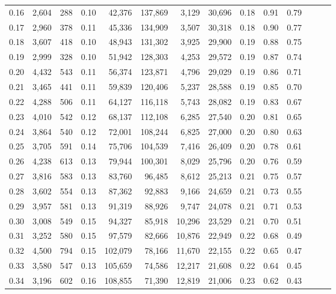 \begin{tabular}{rrrrrrrrrrrrrr}
0.16 &  2,604 &  288 &  0.10 &   42,376 &  137,869 &   3,129 &  30,696 &  0.18 &  0.91 &      0.79 \\
0.17 &  2,960 &  378 &  0.11 &   45,336 &  134,909 &   3,507 &  30,318 &  0.18 &  0.90 &      0.77 \\
0.18 &  3,607 &  418 &  0.10 &   48,943 &  131,302 &   3,925 &  29,900 &  0.19 &  0.88 &      0.75 \\
0.19 &  2,999 &  328 &  0.10 &   51,942 &  128,303 &   4,253 &  29,572 &  0.19 &  0.87 &      0.74 \\
0.20 &  4,432 &  543 &  0.11 &   56,374 &  123,871 &   4,796 &  29,029 &  0.19 &  0.86 &      0.71 \\
0.21 &  3,465 &  441 &  0.11 &   59,839 &  120,406 &   5,237 &  28,588 &  0.19 &  0.85 &      0.70 \\
0.22 &  4,288 &  506 &  0.11 &   64,127 &  116,118 &   5,743 &  28,082 &  0.19 &  0.83 &      0.67 \\
0.23 &  4,010 &  542 &  0.12 &   68,137 &  112,108 &   6,285 &  27,540 &  0.20 &  0.81 &      0.65 \\
0.24 &  3,864 &  540 &  0.12 &   72,001 &  108,244 &   6,825 &  27,000 &  0.20 &  0.80 &      0.63 \\
0.25 &  3,705 &  591 &  0.14 &   75,706 &  104,539 &   7,416 &  26,409 &  0.20 &  0.78 &      0.61 \\
0.26 &  4,238 &  613 &  0.13 &   79,944 &  100,301 &   8,029 &  25,796 &  0.20 &  0.76 &      0.59 \\
0.27 &  3,816 &  583 &  0.13 &   83,760 &   96,485 &   8,612 &  25,213 &  0.21 &  0.75 &      0.57 \\
0.28 &  3,602 &  554 &  0.13 &   87,362 &   92,883 &   9,166 &  24,659 &  0.21 &  0.73 &      0.55 \\
0.29 &  3,957 &  581 &  0.13 &   91,319 &   88,926 &   9,747 &  24,078 &  0.21 &  0.71 &      0.53 \\
0.30 &  3,008 &  549 &  0.15 &   94,327 &   85,918 &  10,296 &  23,529 &  0.21 &  0.70 &      0.51 \\
0.31 &  3,252 &  580 &  0.15 &   97,579 &   82,666 &  10,876 &  22,949 &  0.22 &  0.68 &      0.49 \\
0.32 &  4,500 &  794 &  0.15 &  102,079 &   78,166 &  11,670 &  22,155 &  0.22 &  0.65 &      0.47 \\
0.33 &  3,580 &  547 &  0.13 &  105,659 &   74,586 &  12,217 &  21,608 &  0.22 &  0.64 &      0.45 \\
0.34 &  3,196 &  602 &  0.16 &  108,855 &   71,390 &  12,819 &  21,006 &  0.23 &  0.62 &      0.43 \\

\end{tabular}

